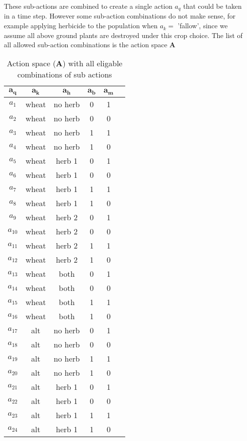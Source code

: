 \documentclass[12pt, a4paper]{article}
\begin{document}
\newpage
These sub-actions are combined to create a single action $a_q$ that could be taken in a time step. However some sub-action combinations do not make sense, for example applying herbicide to the population when $a_k =$ 'fallow', since we assume all above ground plants are destroyed under this crop choice. The list of all allowed sub-action combinations is the action space $\mathbf{A}$   

\begin{longtable}[h]{c c c c c c}
\caption{Action space ($\mathbf{A}$) with all eligable combinations of sub actions\label{table:action_space}}\\
	\hline
	$\mathbf{a_q}$ & $\mathbf{a_k}$ & $\mathbf{a_h}$ & $\mathbf{a_b}$ & $\mathbf{a_m}$\\
	\hline
	$a_1$ & wheat & no herb & 0 & 1\\
	$a_2$ & wheat & no herb & 0 & 0\\
	$a_3$ & wheat & no herb & 1 & 1\\
	$a_4$ & wheat & no herb & 1 & 0\\
	$a_5$ & wheat & herb 1 & 0 & 1\\
	$a_6$ & wheat & herb 1 & 0 & 0\\
	$a_7$ & wheat & herb 1 & 1 & 1\\
	$a_8$ & wheat & herb 1 & 1 & 0\\
	$a_9$ & wheat & herb 2 & 0 & 1\\
	$a_{10}$ & wheat & herb 2 & 0 & 0\\
	$a_{11}$ & wheat & herb 2 & 1 & 1\\
	$a_{12}$ & wheat & herb 2 & 1 & 0\\
	$a_{13}$ & wheat & both & 0 & 1\\
	$a_{14}$ & wheat & both & 0 & 0\\
	$a_{15}$ & wheat & both & 1 & 1\\
	$a_{16}$ & wheat & both & 1 & 0\\
	$a_{17}$ & alt & no herb & 0 & 1\\
	$a_{18}$ & alt & no herb & 0 & 0\\
	$a_{19}$ & alt & no herb & 1 & 1\\
	$a_{20}$ & alt & no herb & 1 & 0\\
	$a_{21}$ & alt & herb 1 & 0 & 1\\
	$a_{22}$ & alt & herb 1 & 0 & 0\\
	$a_{23}$ & alt & herb 1 & 1 & 1\\
	$a_{24}$ & alt & herb 1 & 1 & 0\\

\end{longtable}
\end{document}
